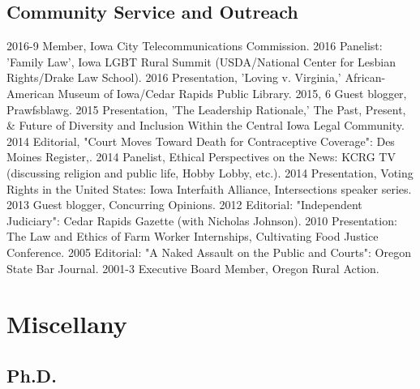 \documentclass[letterpaper]{moderncv}
\begin{document}
\vspace{1mm}
\subsection{Community Service and Outreach}
\cvitem
{2016-9}
{Member, Iowa City Telecommunications Commission.}
\vspace{1mm}
\cvitem
{2016}
{Panelist: 'Family Law', Iowa LGBT Rural Summit (USDA/National Center for Lesbian Rights/Drake Law School).}
\vspace{1mm}
\cvitem
{2016}
{Presentation, 'Loving v. Virginia,' African-American Museum of Iowa/Cedar Rapids Public Library.}
\vspace{1mm}
\cvitem
{2015, 6}
{Guest blogger, Prawfsblawg.}
\vspace{1mm}
\cvitem
{2015}
{Presentation, 'The Leadership Rationale,' The Past, Present, \& Future of Diversity and Inclusion Within the Central Iowa Legal Community.}
\vspace{1mm}
\cvitem
{2014}
{Editorial, "Court Moves Toward Death for Contraceptive Coverage": Des Moines Register,.}
\vspace{1mm}
\cvitem
{2014}
{Panelist, Ethical Perspectives on the News: KCRG TV (discussing religion and public life, Hobby Lobby, etc.).}
\vspace{1mm}
\cvitem
{2014}
{Presentation, Voting Rights in the United States: Iowa Interfaith Alliance, Intersections speaker series.}
\vspace{1mm}
\cvitem
{2013}
{Guest blogger, Concurring Opinions.}
\vspace{1mm}
\cvitem
{2012}
{Editorial: "Independent Judiciary": Cedar Rapids Gazette (with Nicholas Johnson).}
\vspace{1mm}
\cvitem
{2010}
{Presentation: The Law and Ethics of Farm Worker Internships, Cultivating Food Justice Conference.}
\vspace{1mm}
\cvitem
{2005}
{Editorial: "A Naked Assault on the Public and Courts": Oregon State Bar Journal.}
\vspace{1mm}
\cvitem
{2001-3}
{Executive Board Member, Oregon Rural Action.}
\vspace{1mm}
%
%
\section{Miscellany}
\subsection{Ph.D.}
\end{document}
